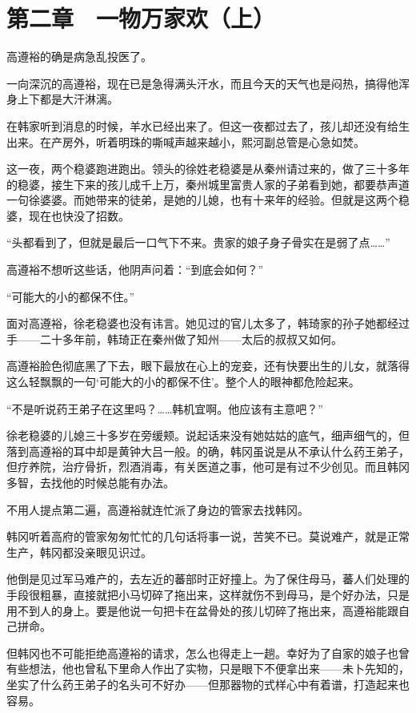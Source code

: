 \section{第二章　一物万家欢（上）}

高遵裕的确是病急乱投医了。

一向深沉的高遵裕，现在已是急得满头汗水，而且今天的天气也是闷热，搞得他浑身上下都是大汗淋漓。

在韩家听到消息的时候，羊水已经出来了。但这一夜都过去了，孩儿却还没有给生出来。在产房外，听着明珠的嘶喊声越来越小，熙河副总管是心急如焚。

这一夜，两个稳婆跑进跑出。领头的徐姓老稳婆是从秦州请过来的，做了三十多年的稳婆，接生下来的孩儿成千上万，秦州城里富贵人家的子弟看到她，都要恭声道一句徐婆婆。而她带来的徒弟，是她的儿媳，也有十来年的经验。但就是这两个稳婆，现在也快没了招数。

“头都看到了，但就是最后一口气下不来。贵家的娘子身子骨实在是弱了点……”

高遵裕不想听这些话，他阴声问着：“到底会如何？”

“可能大的小的都保不住。”

面对高遵裕，徐老稳婆也没有讳言。她见过的官儿太多了，韩琦家的孙子她都经过手——二十多年前，韩琦正在秦州做了知州——太后的叔叔又如何。

高遵裕脸色彻底黑了下去，眼下最放在心上的宠妾，还有快要出生的儿女，就落得这么轻飘飘的一句‘可能大的小的都保不住’。整个人的眼神都危险起来。

“不是听说药王弟子在这里吗？……韩机宜啊。他应该有主意吧？”

徐老稳婆的儿媳三十多岁在旁缓颊。说起话来没有她姑姑的底气，细声细气的，但落到高遵裕的耳中却是黄钟大吕一般。的确，韩冈虽说是从不承认什么药王弟子，但疗养院，治疗骨折，烈酒消毒，有关医道之事，他可是有过不少创见。而且韩冈多智，去找他的时候总能有办法。

不用人提点第二遍，高遵裕就连忙派了身边的管家去找韩冈。

韩冈听着高府的管家匆匆忙忙的几句话将事一说，苦笑不已。莫说难产，就是正常生产，韩冈都没亲眼见识过。

他倒是见过军马难产的，去左近的蕃部时正好撞上。为了保住母马，蕃人们处理的手段很粗暴，直接就把小马切碎了拖出来，这样就伤不到母马，是个好办法，只是用不到人的身上。要是他说一句把卡在盆骨处的孩儿切碎了拖出来，高遵裕能跟自己拼命。

但韩冈也不可能拒绝高遵裕的请求，怎么也得走上一趟。幸好为了自家的娘子也曾有些想法，他也曾私下里命人作出了实物，只是眼下不便拿出来——未卜先知的，坐实了什么药王弟子的名头可不好办——但那器物的式样心中有着谱，打造起来也容易。

